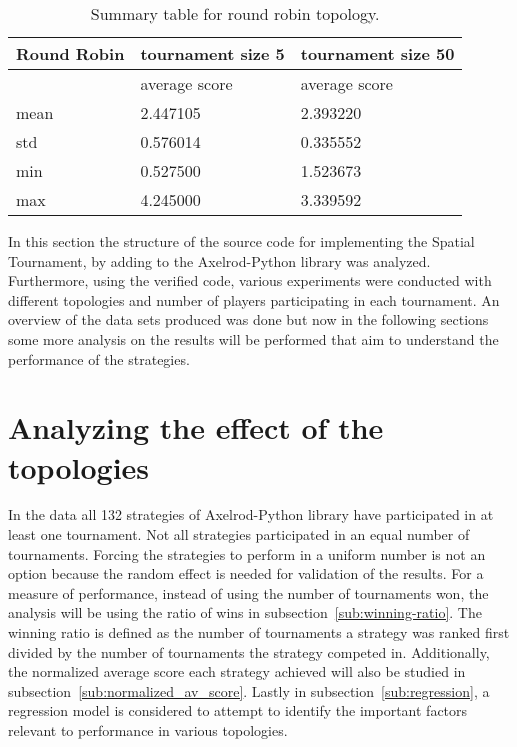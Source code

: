 \begin{table}[H]
\centering
\begin{tabular}{|l|l|l|}
\hline
Round Robin & \multicolumn{1}{c|}{tournament size 5} & \multicolumn{1}{c|}{tournament size 50} \\ \hline

            & average score            & average score             \\ \hline
mean        & 2.447105                 & 2.393220                  \\ \hline
std         & 0.576014                 & 0.335552                  \\ \hline
min         & 0.527500                 & 1.523673                  \\ \hline
max         & 4.245000                 & 3.339592                  \\ \hline
\end{tabular}
\caption{Summary table for round robin topology.}
\label{sum-rr}
\end{table}

In this section the structure of the source code for implementing the Spatial
Tournament, by adding to the Axelrod-Python library was analyzed. Furthermore,
using the verified code, various experiments were conducted with different
topologies
and number of players participating in each tournament. An overview of the
data sets produced was done but now in the following sections
some more analysis on the results will be performed that aim to understand
the performance of the strategies.


\section{Analyzing the effect of the topologies}
\label{sub:analyzing_the_effect_of_the_topologies}

In the data all 132 strategies of Axelrod-Python library have participated in at
least one tournament. Not all strategies participated in an equal number of tournaments.
Forcing the strategies to perform in a uniform number is
not an option because the random effect is needed for validation of the
results. For a measure of
performance, instead of using the number of tournaments won, the analysis will
be using the ratio of wins in subsection~\ref{sub:winning-ratio}.
The winning ratio is defined as the number of tournaments a strategy was ranked
first divided by the number of tournaments the strategy competed in.
Additionally, the normalized average score each strategy
achieved will also be studied in subsection~\ref{sub:normalized_av_score}.
Lastly in subsection~\ref{sub:regression}, a regression model is considered to
attempt to identify the important factors relevant to performance in various
topologies.

